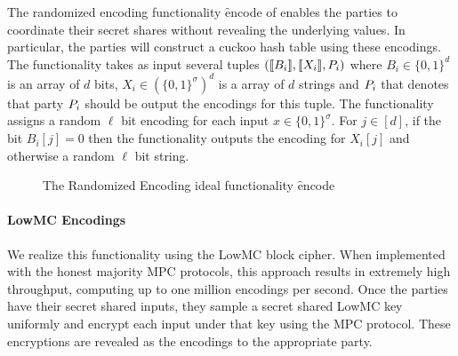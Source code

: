 The randomized encoding functionality \f{encode} of  enables the parties to coordinate their secret shares without revealing the underlying values. In particular, the parties will construct a cuckoo hash table using these encodings. The functionality takes as input several tuples $(\llbracket B_i\rrbracket,\llbracket X_i\rrbracket,P_{i})$ where $B_i\in\{0,1\}^d$ is an array of $d$ bits, $ X_i\in(\{0,1\}^\sigma)^{d}$ is a array of $d$ strings and  $P_{i}$ that denotes that party $P_{i}$ should be output the encodings for this tuple. The functionality assigns a random $\ell$ bit encoding for each input $x\in \{0,1\}^\sigma$. For $j\in[d]$, if the bit $B_i[j]=0$ then the functionality outputs the encoding for $X_i[j]$ and otherwise a random $\ell$ bit string.



\begin{figure}[ht]
	\caption{The Randomized Encoding ideal functionality \f{encode}}
	\label{fig:randomized-encode-ideal}	
\end{figure}


\paragraph{LowMC Encodings}
We realize this functionality using the LowMC block cipher\cite{lowmc}. When implemented with the honest majority MPC protocols\cite{aby3, highthroughput}, this approach results in extremely high throughput, computing up to one million encodings per second. Once the parties have their secret shared inputs, they sample a secret shared LowMC key uniformly and encrypt each input under that key using the MPC protocol. These encryptions are revealed as the encodings to the appropriate party.


